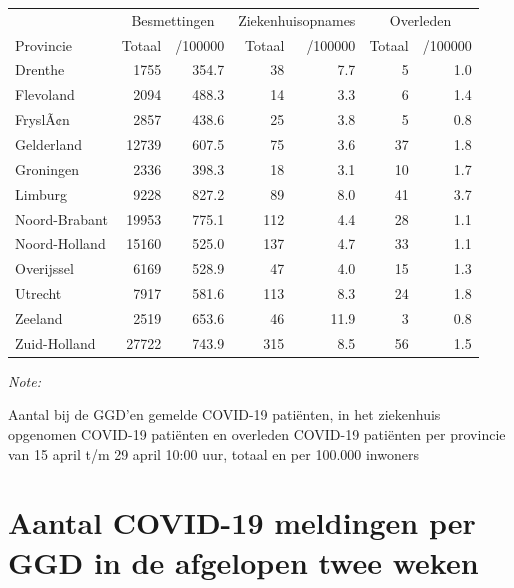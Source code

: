 \documentclass[
  english,
  man,floatsintext]{apa6}
\begin{document}
\begin{table}
\centering
\begin{threeparttable}
\begin{tabular}{lrrrrrr}
\toprule
\multicolumn{1}{c}{ } & \multicolumn{2}{c}{Besmettingen} & \multicolumn{2}{c}{Ziekenhuisopnames} & \multicolumn{2}{c}{Overleden} \\
\cmidrule(l{3pt}r{3pt}){2-3} \cmidrule(l{3pt}r{3pt}){4-5} \cmidrule(l{3pt}r{3pt}){6-7}
Provincie & Totaal & /100000 & Totaal & /100000 & Totaal & /100000\\
\midrule
Drenthe & 1755 & 354.7 & 38 & 7.7 & 5 & 1.0\\
Flevoland & 2094 & 488.3 & 14 & 3.3 & 6 & 1.4\\
FryslÃ¢n & 2857 & 438.6 & 25 & 3.8 & 5 & 0.8\\
Gelderland & 12739 & 607.5 & 75 & 3.6 & 37 & 1.8\\
Groningen & 2336 & 398.3 & 18 & 3.1 & 10 & 1.7\\
Limburg & 9228 & 827.2 & 89 & 8.0 & 41 & 3.7\\
Noord-Brabant & 19953 & 775.1 & 112 & 4.4 & 28 & 1.1\\
Noord-Holland & 15160 & 525.0 & 137 & 4.7 & 33 & 1.1\\
Overijssel & 6169 & 528.9 & 47 & 4.0 & 15 & 1.3\\
Utrecht & 7917 & 581.6 & 113 & 8.3 & 24 & 1.8\\
Zeeland & 2519 & 653.6 & 46 & 11.9 & 3 & 0.8\\
Zuid-Holland & 27722 & 743.9 & 315 & 8.5 & 56 & 1.5\\
\bottomrule
\end{tabular}
\begin{tablenotes}
\item \textit{Note: } 
\item Aantal bij de GGD’en gemelde COVID-19 patiënten, in het ziekenhuis opgenomen COVID-19 patiënten en overleden COVID-19 patiënten per provincie van 15 april t/m 29 april 10:00 uur, totaal en per 100.000 inwoners
\end{tablenotes}
\end{threeparttable}
\end{table}

\newpage

\hypertarget{aantal-covid-19-meldingen-per-ggd-in-de-afgelopen-twee-weken}{%
\section{Aantal COVID-19 meldingen per GGD in de afgelopen twee weken}\label{aantal-covid-19-meldingen-per-ggd-in-de-afgelopen-twee-weken}}
\end{document}
